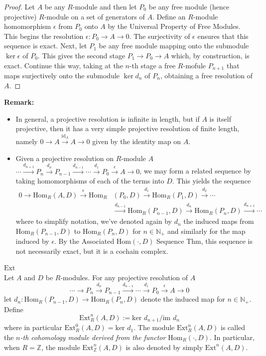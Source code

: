 \begin{proof}
    Let $A$ be any $R$-module and then let $P_0$ be any free module (hence projective) $R$-module on a set of generators of $A$. Define an $R$-module homomorphism $\epsilon$ from $P_0$ onto $A$ by the Universal Property of Free Modules. This begins the resolution $\epsilon: P_0\to A\to 0$. The surjectivity of $\epsilon$ ensures that this sequence is exact. Next, let $P_1$ be any free module mapping onto the submodule $\ker \epsilon$ of $P_0$. This gives the second stage $P_1\to P_0\to A$ which, by construction, is exact. Continue this way, taking at the $n$-th stage a free $R$-mofule $P_{n+1}$ that maps surjectively onto the submodule $\ker d_n$ of $P_n$, obtaining a free resolution of $A$.
\end{proof}

\noindent\textbf{Remark:} \begin{itemize}
    \item In general, a projective resolution is infinite in length, but if $A$ is itself projective, then it has a very simple projective resolution of finite length, namely $0\to A \xrightarrow{\text{id}_A} A\to 0$ given by the identity map on $A$.

    \item Given a projective resolution on $R$-module $A$ $\cdots \xrightarrow{d_{n+1}} P_n \xrightarrow{d_n} P_{n-1} \xrightarrow{d_{n-1}} \cdots \xrightarrow{d_1} P_0 \xrightarrow{\epsilon} A\to 0$, we may form a related sequence by taking homomorphisms of each of the terms into $D$. This yields the sequence
    \begin{align*}
        0\to \text{Hom}_R(A,D) \xrightarrow{\epsilon} \text{Hom}_R&(P_0,D) \xrightarrow{d_1} \text{Hom}_R (P_1,D) \xrightarrow{d_2} \cdots\\
        &\xrightarrow{d_{n-1}} \text{Hom}_R (P_{n-1},D) \xrightarrow{d_n} \text{Hom}_R (P_n,D) \xrightarrow{d_{n+1}} \cdots
    \end{align*}
    where to simplify notation, we've denoted again by $d_n$ the induced maps from $\text{Hom}_R(P_{n-1},D)$ to $\text{Hom}_R(P_n,D)$ for $n\in \mathbb{N}_+$ and similarly for the map induced by $\epsilon$. By the Associated $\text{Hom} (\cdot, D)$ Sequence Thm, this sequence is not necessarily exact, but it is a cochain complex.
\end{itemize}

\begin{definition}{$\text{Ext}$}\\
Let $A$ and $D$ be $R$-modules. For any projective resolution of $A$
\[
\cdots \to P_n \xrightarrow{d_n} P_{n-1} \xrightarrow{d_{n-1}} \cdots \xrightarrow{d_1} P_0 \xrightarrow{\epsilon} A\to0
\]
let $d_n: \text{Hom}_R (P_{n-1},D) \to \text{Hom}_R (P_n,D)$ denote the induced map for $n \in \mathbb{N}_+$. Define
\[
\text{Ext}_R^n (A,D) := \text{ker }d_{n+1}/ \text{im }d_n
\]
where in particular $\text{Ext}_R^0 (A,D)= \text{ker }d_1$. The module $\text{Ext}_R^n (A,D)$ is called the \textit{$n$-th cohomology module derived from the functor $\text{Hom}_R (\cdot,D)$}. In particular, when $R=\mathbb{Z}$, the module $\text{Ext}_\mathbb{Z}^n (A,D)$ is also denoted by simply $\text{Ext}^n (A,D)$.
\end{definition}

